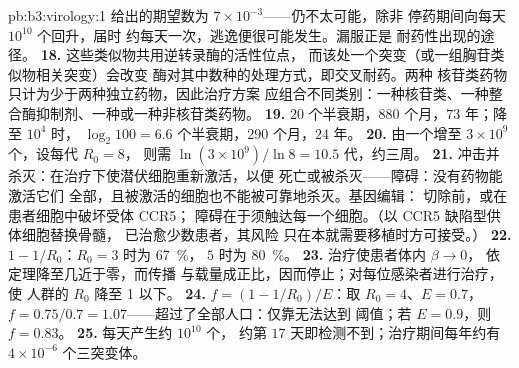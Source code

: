 \begin{solution}{pb:b3:virology:1}
给出的期望数为 $7\times 10^{-3}$——仍不太可能，除非
停药期间向每天 $10^{10}$ 个回升，届时
约每天一次，逃逸便很可能发生。漏服正是
耐药性出现的途径。
\textbf{18.} 这些类似物共用逆转录酶的活性位点，
而该处一个突变（或一组胸苷类似物相关突变）会改变
酶对其中数种的处理方式，即交叉耐药。两种
核苷类药物只计为少于两种独立药物，因此治疗方案
应组合不同类别：一种核苷类、一种整合酶抑制剂、一种或一种非核苷类药物。
\textbf{19.} $20$ 个半衰期，$880$ 个月，$73$ 年；降至 $10^{4}$ 时，
$\log_{2}100 = 6.6$ 个半衰期，$290$ 个月，$24$ 年。
\textbf{20.} 由一个增至 $3\times 10^{9}$ 个，设每代 $R_{0} = 8$，
则需 $\ln(3\times 10^{9})/\ln 8 = 10.5$ 代，约三周。
\textbf{21.} 冲击并杀灭：在治疗下使潜伏细胞重新激活，以便
死亡或被杀灭——障碍：没有药物能激活它们
全部，且被激活的细胞也不能被可靠地杀灭。基因编辑：
切除前，或在患者细胞中破坏受体 CCR5；
障碍在于须触达每一个细胞。（以 CCR5 缺陷型供体细胞替换骨髓，
已治愈少数患者，其风险
只在本就需要移植时方可接受。）
\textbf{22.} $1 - 1/R_{0}$：$R_{0} = 3$ 时为 \qty{67}{\%}，
$5$ 时为 \qty{80}{\%}。
\textbf{23.} 治疗使患者体内 $\beta \to 0$，
依定理降至几近于零，而传播
与载量成正比，因而停止；对每位感染者进行治疗，使
人群的 $R_{0}$ 降至 1 以下。
\textbf{24.} $f = (1 - 1/R_{0})/E$：取 $R_{0} = 4$、$E = 0.7$，$f =
0.75/0.7 = 1.07$——超过了全部人口：仅靠无法达到
阈值；若 $E = 0.9$，则 $f = 0.83$。
\textbf{25.} 每天产生约 $10^{10}$ 个，
约第 $17$ 天即检测不到；治疗期间每年约有 $4\times 10^{-6}$ 个三突变体。
\end{solution}
